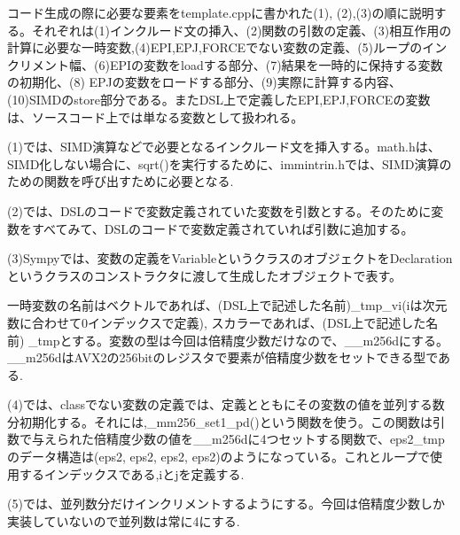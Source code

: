 \documentclass{jarticle}
\begin{document}
コード生成の際に必要な要素をtemplate.cppに書かれた(1), (2),(3)の順に説明する。それぞれは(1)インクルード文の挿入、(2)関数の引数の定義、(3)相互作用の計算に必要な一時変数,(4)EPI,EPJ,FORCEでない変数の定義、(5)ループのインクリメント幅、(6)EPIの変数をloadする部分、(7)結果を一時的に保持する変数の初期化、(8) EPJの変数をロードする部分、(9)実際に計算する内容、(10)SIMDのstore部分である。またDSL上で定義したEPI,EPJ,FORCEの変数は、ソースコード上では単なる変数として扱われる。

(1)では、SIMD演算などで必要となるインクルード文を挿入する。math.hは、SIMD化しない場合に、sqrt()を実行するために、immintrin.hでは、SIMD演算のための関数を呼び出すために必要となる.

(2)では、DSLのコードで変数定義されていた変数を引数とする。そのために変数をすべてみて、DSLのコードで変数定義されていれば引数に追加する。

(3)Sympyでは、変数の定義をVariableというクラスのオブジェクトをDeclarationというクラスのコンストラクタに渡して生成したオブジェクトで表す。

一時変数の名前はベクトルであれば、(DSL上で記述した名前)\_tmp\_v{i}(iは次元数に合わせて0インデックスで定義), スカラーであれば、(DSL上で記述した名前) \_tmpとする。変数の型は今回は倍精度少数だけなので、\_\_m256dにする。\_\_m256dはAVX2の256bitのレジスタで要素が倍精度少数をセットできる型である.

(4)では、classでない変数の定義では、定義とともにその変数の値を並列する数分初期化する。それには,\_mm256\_set1\_pd()という関数を使う。この関数は引数で与えられた倍精度少数の値を\_\_m256dに4つセットする関数で、eps2\_tmpのデータ構造は(eps2, eps2, eps2, eps2)のようになっている。これとループで使用するインデックスである,iとjを定義する.

(5)では、並列数分だけインクリメントするようにする。今回は倍精度少数しか実装していないので並列数は常に4にする.
\end{document}
